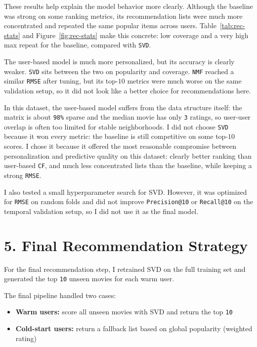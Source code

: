 \documentclass[10pt,a4paper]{article}
\begin{document}
These results help explain the model behavior more clearly. Although the baseline was strong on some ranking metrics, its recommendation lists were much more concentrated and repeated the same popular items across users. Table~\ref{tab:rec-stats} and Figure~\ref{fig:rec-stats} make this concrete: low coverage and a very high max repeat for the baseline, compared with \texttt{SVD}.

The user-based model is much more personalized, but its accuracy is clearly weaker. \texttt{SVD} sits between the two on popularity and coverage. \texttt{NMF} reached a similar \texttt{RMSE} after tuning, but its top-$10$ metrics were much worse on the same validation setup, so it did not look like a better choice for recommendations here.

In this dataset, the user-based model suffers from the data structure itself: the matrix is about \texttt{98\%} sparse and the median movie has only \texttt{3} ratings, so user-user overlap is often too limited for stable neighborhoods. I did not choose \texttt{SVD} because it won every metric: the baseline is still competitive on some top-$10$ scores. I chose it because it offered the most reasonable compromise between personalization and predictive quality on this dataset: clearly better ranking than user-based \texttt{CF}, and much less concentrated lists than the baseline, while keeping a strong \texttt{RMSE}.

I also tested a small hyperparameter search for SVD. However, it was optimized for \texttt{RMSE} on random folds and did not improve \texttt{Precision@10} or \texttt{Recall@10} on the temporal validation setup, so I did not use it as the final model.

\section*{5. Final Recommendation Strategy}
For the final recommendation step, I retrained SVD on the full training set and generated the top \texttt{10} unseen movies for each warm user.

The final pipeline handled two cases:

\begin{itemize}
\item \textbf{Warm users:} score all unseen movies with SVD and return the top \texttt{10}
\item \textbf{Cold-start users:} return a fallback list based on global popularity (weighted rating)
\end{itemize}
\end{document}

